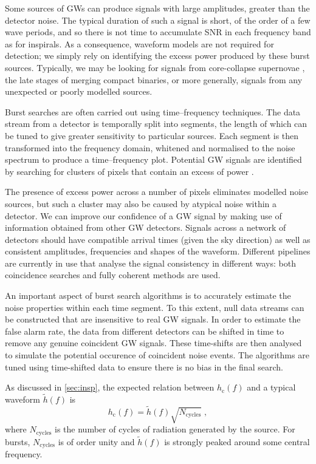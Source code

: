 Some sources of GWs can produce signals with large amplitudes, greater than the detector noise. The typical duration of such a signal is short, of the order of a few wave periods, and so there is not time to accumulate SNR in each frequency band as for inspirals. As a consequence, waveform models are not required for detection; we simply rely on identifying the excess power produced by these burst sources. Typically, we may be looking for signals from core-collapse supernovae \citep{Ott2009}, the late stages of merging compact binaries, or more generally, signals from any unexpected or poorly modelled sources.

Burst searches are often carried out using time--frequency techniques. The data stream from a detector is temporally split into segments, the length of which can be tuned to give greater sensitivity to particular sources. Each segment is then transformed into the frequency domain, whitened and normalised to the noise spectrum to produce a time--frequency plot. Potential GW signals are identified by searching for clusters of pixels that contain an excess of power \citep[e.g.,][]{Bursts}.

The presence of excess power across a number of pixels eliminates modelled noise sources, but such a cluster may also be caused by atypical noise within a detector. We can improve our confidence of a GW signal by making use of information obtained from other GW detectors. Signals across a network of detectors should have compatible arrival times (given the sky direction) as well as consistent amplitudes, frequencies and shapes of the waveform. Different pipelines are currently in use that analyse the signal consistency in different ways: both coincidence searches \citep{Chatterji2004} and fully coherent methods \citep{Klimenko2008} are used.

An important aspect of burst search algorithms is to accurately estimate the noise properties within each time segment. To this extent, null data streams can be constructed that are insensitive to real GW signals. In order to estimate the false alarm rate, the data from different detectors can be shifted in time to remove any genuine coincident GW signals. These time-shifts are then analysed to simulate the potential occurence of coincident noise events. The algorithms are tuned using time-shifted data to ensure there is no bias in the final search.

As discussed in \ref{sec:insp}, the expected relation between $h_\mathrm{c}(f)$ and a typical waveform $\tilde{h}(f)$ is
\begin{equation}\label{eq:simple} 
h_\mathrm{c}(f) = \tilde{h}(f)\sqrt{{N}_{\mathrm{cycles}}} \; , 
\end{equation}
where ${N}_{\mathrm{cycles}}$ is the number of cycles of radiation generated by the source. For bursts, $N_{\mathrm{cycles}}$ is of order unity and $\tilde{h}(f)$ is strongly peaked around some central frequency.


